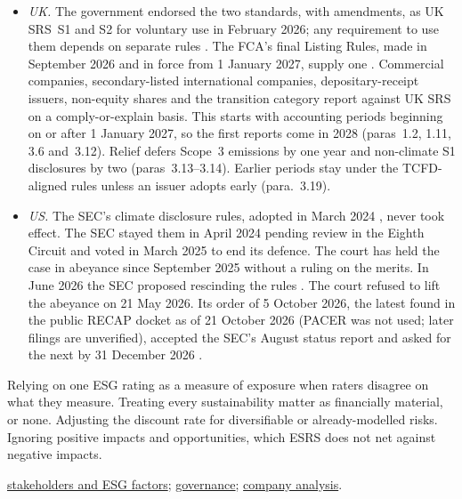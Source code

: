 \begin{qfmethod}
\begin{itemize}
\item \emph{UK.} The government endorsed the two standards, with amendments, as UK SRS~S1 and S2 for voluntary use in February 2026; any requirement to use them depends on separate rules \citep[paras~1.4--1.5 and~1.15]{uk-srs-response-2026}. The FCA's final Listing Rules, made in September 2026 and in force from 1 January 2027, supply one \citep[app.~1, FCA 2026/56, para.~C]{fca-ps26-19-2026}. Commercial companies, secondary-listed international companies, depositary-receipt issuers, non-equity shares and the transition category report against UK SRS on a comply-or-explain basis. This starts with accounting periods beginning on or after 1 January 2027, so the first reports come in 2028 (paras~1.2, 1.11, 3.6 and~3.12). Relief defers Scope~3 emissions by one year and non-climate S1 disclosures by two (paras~3.13--3.14). Earlier periods stay under the TCFD-aligned rules unless an issuer adopts early (para.~3.19).
\item \emph{US.} The SEC's climate disclosure rules, adopted in March 2024 \citep[p.~21668]{sec-climate-rule-2024}, never took effect. The SEC stayed them in April 2024 pending review in the Eighth Circuit and voted in March 2025 to end its defence. The court has held the case in abeyance since September 2025 without a ruling on the merits. In June 2026 the SEC proposed rescinding the rules \citep[pp.~33296 and~33299--33300]{sec-climate-rescission-proposal-2026}. The court refused to lift the abeyance on 21 May 2026. Its order of 5 October 2026, the latest found in the public RECAP docket as of 21 October 2026 (PACER was not used; later filings are unverified), accepted the SEC's August status report and asked for the next by 31 December 2026 \citep[orders of 21 May and 5 October 2026]{ca8-iowa-v-sec-2026}.
\end{itemize}

 Relying on one ESG rating as a measure of exposure when raters disagree on what they measure. Treating every sustainability matter as financially material, or none. Adjusting the discount rate for diversifiable or already-modelled risks. Ignoring positive impacts and opportunities, which ESRS does not net against negative impacts.

 \hyperref[def:stakeholder-claims]{stakeholders and ESG factors}; \hyperref[meth:corporate-governance-evaluation]{governance}; \hyperref[meth:company-position-analysis]{company analysis}.

\end{qfmethod}
